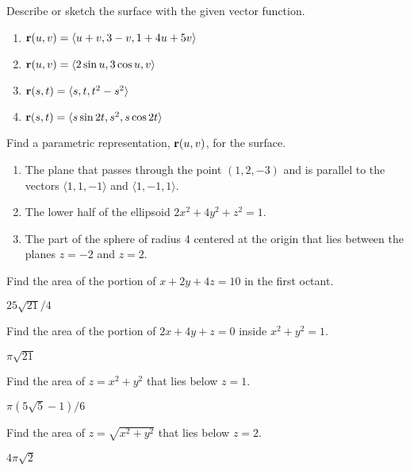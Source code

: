 \begin{enumialphparenastyle}

\begin{ex}
Describe or sketch the surface with the given vector function.
\begin{enumerate}
  \item	${\bf r}(u,v) = \langle u+v,3-v,1+4u+5v\rangle$
  \item	${\bf r}(u,v) = \langle 2\sin u, 3\cos u, v\rangle$ 
  \item	${\bf r}(s,t) = \langle s,t,t^2-s^2\rangle$
  \item	${\bf r}(s,t) = \langle s\sin 2t, s^2, s\cos 2t\rangle$
\end{enumerate}
\end{ex}

\begin{ex}
Find a parametric representation, ${\bf r}(u,v)$, for the surface.
\begin{enumerate}
  \item	The plane that passes through the point $(1,2,-3)$ and is parallel
  to the vectors $\langle 1,1,-1\rangle$ and $\langle 1,-1,1\rangle$.
  \item	The lower half of the ellipsoid $2x^2+4y^2+z^2=1$.
  \item	The part of the sphere of radius 4 centered at the origin that lies
  between the planes $z=-2$ and $z=2$.
\end{enumerate}
\end{ex}

\begin{ex}
Find the area of the portion of $x+2y+4z=10$ in the first octant.
\begin{sol}
	$25\sqrt{21}/4$
\end{sol}
\end{ex}

\begin{ex}
Find the area of the portion of $2x+4y+z=0$ inside $x^2+y^2=1$.
\begin{sol}
	$\pi\sqrt{21}$
\end{sol}
\end{ex}

\begin{ex}
Find the area of $z=x^2+y^2$ that lies below $z=1$.
\begin{sol}
	$\pi(5\sqrt5-1)/6$
\end{sol}
\end{ex}

\begin{ex}
Find the area of $z=\sqrt{x^2+y^2}$ that lies below $z=2$.
\begin{sol}
	$4\pi\sqrt2$
\end{sol}
\end{ex}


\end{enumialphparenastyle}
